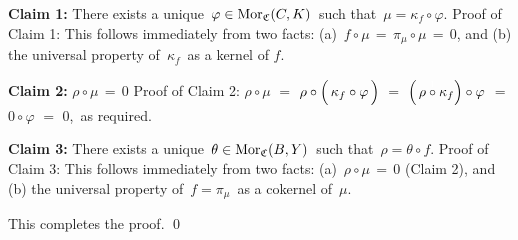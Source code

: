 \begin{enumerate}
	\vskip 0.3cm
	\noindent
	\textbf{Claim 1:}\;\; There exists a unique \,$\varphi \in \textnormal{Mor}_{\mathfrak{C}}(C,K)$\, such that \,$\mu = \kappa_{f} \circ \varphi$.
	\vskip 0.1cm
	\noindent
	Proof of Claim 1:\;
	This follows immediately from two facts:
	(a)	\,$f \circ \mu \,=\, \pi_{\mu} \circ \mu \,=\, 0$, and
	(b)	the universal property of \,$\kappa_{f}$\, as a kernel of $f$.

	\vskip 0.3cm
	\noindent
	\textbf{Claim 2:}\;\; $\rho \circ \mu \,=\, 0$
	\vskip 0.1cm
	\noindent
	Proof of Claim 2:\;
	$\rho \circ \mu$
	\;$=$\; $\rho \circ \left(\, \kappa_{f} \overset{{\color{white}1}}{\circ} \varphi \,\right)$
	\;$=$\; $\left(\, \rho \overset{{\color{white}1}}{\circ} \kappa_{f} \right) \circ \varphi$
	\;$=$\; $0 \circ \varphi$
	\;$=$\; $0$,\,
	as required.

	\vskip 0.3cm
	\noindent
	\textbf{Claim 3:}\;\;
	There exists a unique \,$\theta \in \textnormal{Mor}_{\mathfrak{C}}(B,Y)$\, such that \,$\rho = \theta \circ f$.
	\vskip 0.1cm
	\noindent
	Proof of Claim 3:\;
	This follows immediately from two facts:
	(a)	\,$\rho \circ \mu \,=\, 0$ (Claim 2), and
	(b)	the universal property of \,$f = \pi_{\mu}$\, as a cokernel of \,$\mu$.

	\vskip 0.3cm
	\noindent
	This completes the proof.
	\qed
\end{enumerate}


